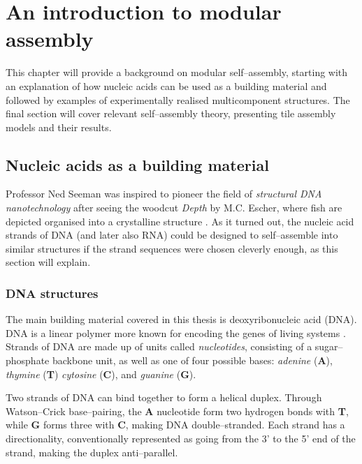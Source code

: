 
\chapter{An introduction to modular assembly}
\label{ch:polycubes_intro}

\minitoc

This chapter will provide a background on modular self--assembly, starting with an explanation of how nucleic acids can be used as a building material and followed by examples of experimentally realised multicomponent structures. The final section will cover relevant self--assembly theory, presenting tile assembly models and their results.


\section{Nucleic acids as a building material}
Professor Ned Seeman was inspired to pioneer the field of \emph{structural DNA nanotechnology} after seeing the woodcut \emph{Depth} by M.C. Escher, where fish are depicted organised into a crystalline structure \cite{seeman_2016}. As it turned out, the nucleic acid strands of DNA (and later also RNA) could be designed to self--assemble into similar structures if the strand sequences were chosen cleverly enough, as this section will explain.

\subsection{DNA structures}

The main building material covered in this thesis is deoxyribonucleic acid (DNA). DNA is a linear polymer more known for encoding the genes of living systems \cite{calladine1997understanding}. Strands of DNA are made up of units called \emph{nucleotides}, consisting of a sugar--phosphate backbone unit, as well as one of four possible bases: \emph{adenine} (\textbf{A}), \emph{thymine} (\textbf{T}) \emph{cytosine} (\textbf{C}), and \emph{guanine} (\textbf{G}). 

Two strands of DNA can bind together to form a helical duplex. Through Watson--Crick base--pairing, the \textbf{A} nucleotide form two hydrogen bonds with \textbf{T}, while \textbf{G} forms three with \textbf{C}, making DNA double--stranded. Each strand has a directionality, conventionally represented as going from the 3' to the 5' end of the strand, making the duplex anti--parallel.

